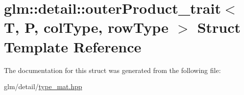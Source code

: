 \hypertarget{structglm_1_1detail_1_1outerProduct__trait}{\section{glm\-:\-:detail\-:\-:outer\-Product\-\_\-trait$<$ T, P, col\-Type, row\-Type $>$ Struct Template Reference}
\label{structglm_1_1detail_1_1outerProduct__trait}
}


The documentation for this struct was generated from the following file\-:\begin{DoxyCompactItemize}
\item 
glm/detail/\hyperlink{type__mat_8hpp}{type\-\_\-mat.\-hpp}\end{DoxyCompactItemize}
